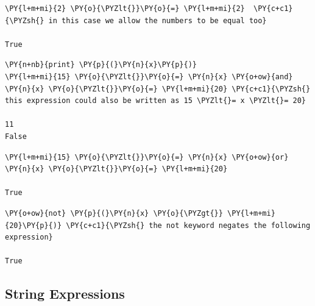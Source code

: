 \begin{tcolorbox}[breakable, size=fbox, boxrule=1pt, pad at break*=1mm, colback=cellbackground, colframe=cellborder]
\begin{Verbatim}[commandchars=\\\{\}]
\PY{l+m+mi}{2} \PY{o}{\PYZlt{}}\PY{o}{=} \PY{l+m+mi}{2}  \PY{c+c1}{\PYZsh{} in this case we allow the numbers to be equal too}

True
\end{Verbatim}
\end{tcolorbox}

\begin{tcolorbox}[breakable, size=fbox, boxrule=1pt, pad at break*=1mm, colback=cellbackground, colframe=cellborder]
\begin{Verbatim}[commandchars=\\\{\}]
\PY{n+nb}{print} \PY{p}{(}\PY{n}{x}\PY{p}{)}
\PY{l+m+mi}{15} \PY{o}{\PYZlt{}}\PY{o}{=} \PY{n}{x} \PY{o+ow}{and} \PY{n}{x} \PY{o}{\PYZlt{}}\PY{o}{=} \PY{l+m+mi}{20} \PY{c+c1}{\PYZsh{} this expression could also be written as 15 \PYZlt{}= x \PYZlt{}= 20}

11
False
\end{Verbatim}
\end{tcolorbox}

\begin{tcolorbox}[breakable, size=fbox, boxrule=1pt, pad at break*=1mm, colback=cellbackground, colframe=cellborder]            
\begin{Verbatim}[commandchars=\\\{\}]
\PY{l+m+mi}{15} \PY{o}{\PYZlt{}}\PY{o}{=} \PY{n}{x} \PY{o+ow}{or} \PY{n}{x} \PY{o}{\PYZlt{}}\PY{o}{=} \PY{l+m+mi}{20}

True
\end{Verbatim}
\end{tcolorbox}

\begin{tcolorbox}[breakable, size=fbox, boxrule=1pt, pad at break*=1mm, colback=cellbackground, colframe=cellborder]            
\begin{Verbatim}[commandchars=\\\{\}]
\PY{o+ow}{not} \PY{p}{(}\PY{n}{x} \PY{o}{\PYZgt{}} \PY{l+m+mi}{20}\PY{p}{)} \PY{c+c1}{\PYZsh{} the not keyword negates the following expression}

True
\end{Verbatim}
\end{tcolorbox}

\subsection{String Expressions}\label{string-expressions}

